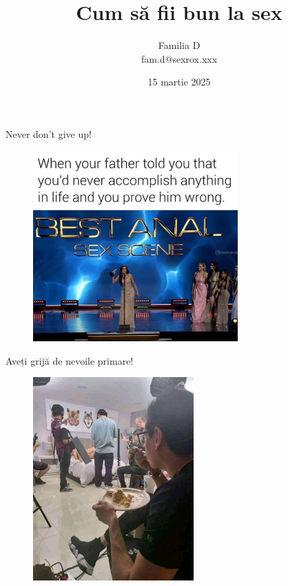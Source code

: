 \documentclass{simple}
\title[Cum să fii bun la sex]{Cum să fii bun la sex}
\institute{Excursie, Moieciu}
\author[Familia D]{Familia D \\
    fam.d@sexrox.xxx}
\date{15 martie 2025}
\begin{document}
\frame{\titlepage}

\begin{frame}{Never don't give up!}
  \pause
  \begin{figure}
    \centering
    \includegraphics[width=0.7\textwidth]{img/best-anal-sex-scene.jpg}
  \end{figure}
\end{frame}

\begin{frame}{Aveți grijă de nevoile primare!}
  \pause
  \begin{figure}
    \centering
    \includegraphics[width=0.55\textwidth]{img/eating-porn-scene.jpg}
  \end{figure}
\end{frame}
\end{document}
